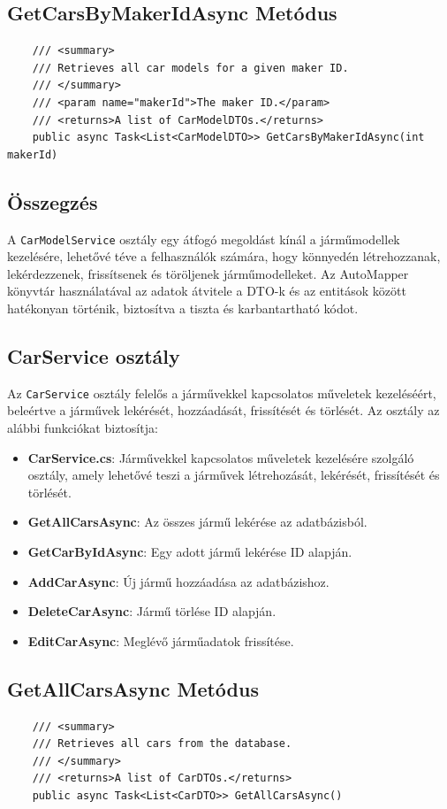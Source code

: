 \documentclass{report}[11pt]
\begin{document}
\subsection*{GetCarsByMakerIdAsync Metódus}
\begin{lstlisting}
    /// <summary>
    /// Retrieves all car models for a given maker ID.
    /// </summary>
    /// <param name="makerId">The maker ID.</param>
    /// <returns>A list of CarModelDTOs.</returns>
    public async Task<List<CarModelDTO>> GetCarsByMakerIdAsync(int makerId)
\end{lstlisting}
\subsection*{Összegzés}
A \texttt{CarModelService} osztály egy átfogó megoldást kínál a járműmodellek kezelésére, lehetővé téve a felhasználók számára, hogy könnyedén létrehozzanak, lekérdezzenek, frissítsenek és töröljenek járműmodelleket. Az AutoMapper könyvtár használatával az adatok átvitele a DTO-k és az entitások között hatékonyan történik, biztosítva a tiszta és karbantartható kódot.

\subsection{CarService osztály}

Az \texttt{CarService} osztály felelős a járművekkel kapcsolatos műveletek kezeléséért, beleértve a járművek lekérését, hozzáadását, frissítését és törlését. Az osztály az alábbi funkciókat biztosítja:

\begin{itemize}
    \item \textbf{CarService.cs}: Járművekkel kapcsolatos műveletek kezelésére szolgáló osztály, amely lehetővé teszi a járművek létrehozását, lekérését, frissítését és törlését.
    \item \textbf{GetAllCarsAsync}: Az összes jármű lekérése az adatbázisból.
    \item \textbf{GetCarByIdAsync}: Egy adott jármű lekérése ID alapján.
    \item \textbf{AddCarAsync}: Új jármű hozzáadása az adatbázishoz.
    \item \textbf{DeleteCarAsync}: Jármű törlése ID alapján.
    \item \textbf{EditCarAsync}: Meglévő járműadatok frissítése.
\end{itemize}

\subsection*{GetAllCarsAsync Metódus}
\begin{lstlisting}
    /// <summary>
    /// Retrieves all cars from the database.
    /// </summary>
    /// <returns>A list of CarDTOs.</returns>
    public async Task<List<CarDTO>> GetAllCarsAsync()
\end{lstlisting}
\end{document}
